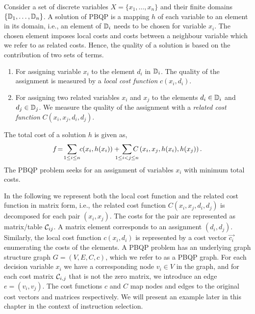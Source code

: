 Consider a set of discrete variables $X=\{x_1,\ldots,x_n\}$ and their
finite domains $\{\mathbb D_1,\ldots,\mathbb D_n\}$. A solution of
PBQP is a mapping $h$ of each variable to an element in its domain,
i.e., an element of $\mathbb D_i$ needs to be chosen for variable
$x_i$. The chosen element imposes local costs and costs between a
neighbour variable which we refer to as related costs.  Hence, the
quality of a solution is based on the contribution of two sets of
terms.
\begin{enumerate}
\item For assigning variable $x_i$ to the element $d_i$ in
  $\mathbb D_i$. The quality of the assignment is measured by a
  \emph{local cost function} $c(x_i, d_i)$.
\item For assigning two related variables $x_i$ and $x_j$ to the
  elements $d_i \in \mathbb D_i$ and $d_j \in \mathbb D_j$.  We
  measure the quality of the assignment with a \emph{related cost
    function\/} $C(x_i,x_j, d_i,d_j)$.
\end{enumerate}
The total cost of a solution $h$ is given as,
\begin{equation}
  f\! =\! \sum_{1 \leq i \leq n} \hspace{-1mm} c(x_i,h(x_i)) + \hspace{-3mm} \sum_{1 \leq i < j  \leq n} \hspace{-3.5mm}
  C\left (x_i,x_j, h(x_i), h(x_j) \right). \label{eqn-pbqp}
\end{equation}
The PBQP problem seeks for an assignment of variables $x_i$ with
minimum total costs.

In the following we represent both the local cost function and the
related cost function in matrix form, i.e., the related cost function
$C(x_i,x_j,d_i,d_j)$ is decomposed for each pair $(x_i,x_j)$. The
costs for the pair are represented as matrix/table ${\mathcal
  C}_{ij}$. A matrix element corresponds to an assignment $(d_i,
d_j)$. Similarly, the local cost function $c(x_i,d_i)$ is represented
by a cost vector $\vec{c_i}$ enumerating the costs of the elements.  A
PBQP problem has an underlying graph structure graph $G=(V,E,C,c)$,
which we refer to as a PBQP graph. For each decision variable $x_i$ we
have a corresponding node $v_i \in V$ in the graph, and for each cost
matrix ${\mathcal C}_{i,j}$ that is not the zero matrix, we
introduce an edge $e=(v_i,v_j)$. The cost functions $c$ and $C$ map
nodes and edges to the original cost vectors and matrices
respectively.  We will present an example later in this chapter in the
context of instruction selection.

